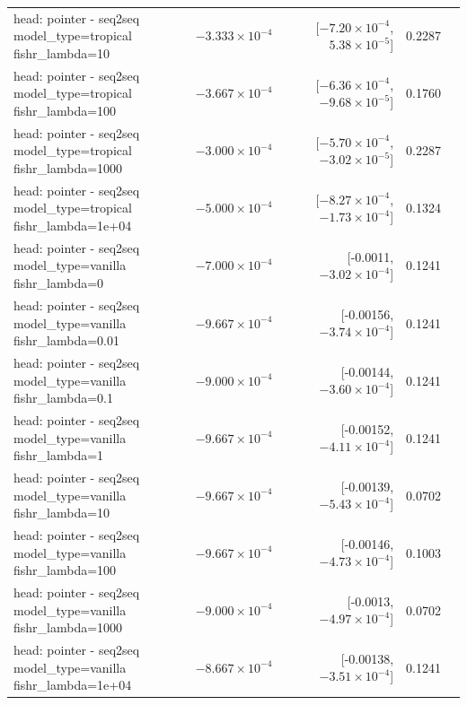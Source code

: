 \documentclass[10pt]{article}
\makeatletter
\newcommand{\stackcell}[1]{\begin{tabular}[t]{@{}l@{}}#1\end{tabular}}
\makeatother
\begin{document}
{\begin{longtable}{lrrrl}
\stackcell{head: pointer - seq2seq\\\footnotesize model\_type=tropical fishr\_lambda=10 } & $-3.333\times10^{-4}$ & [$-7.20\times10^{-4}$, $5.38\times10^{-5}$] & 0.2287 & \\
\stackcell{head: pointer - seq2seq\\\footnotesize model\_type=tropical fishr\_lambda=100 } & $-3.667\times10^{-4}$ & [$-6.36\times10^{-4}$, $-9.68\times10^{-5}$] & 0.1760 & \\
\stackcell{head: pointer - seq2seq\\\footnotesize model\_type=tropical fishr\_lambda=1000 } & $-3.000\times10^{-4}$ & [$-5.70\times10^{-4}$, $-3.02\times10^{-5}$] & 0.2287 & \\
\stackcell{head: pointer - seq2seq\\\footnotesize model\_type=tropical fishr\_lambda=1e+04 } & $-5.000\times10^{-4}$ & [$-8.27\times10^{-4}$, $-1.73\times10^{-4}$] & 0.1324 & \\
\stackcell{head: pointer - seq2seq\\\footnotesize model\_type=vanilla fishr\_lambda=0 } & $-7.000\times10^{-4}$ & [-0.0011, $-3.02\times10^{-4}$] & 0.1241 & \\
\stackcell{head: pointer - seq2seq\\\footnotesize model\_type=vanilla fishr\_lambda=0.01 } & $-9.667\times10^{-4}$ & [-0.00156, $-3.74\times10^{-4}$] & 0.1241 & \\
\stackcell{head: pointer - seq2seq\\\footnotesize model\_type=vanilla fishr\_lambda=0.1 } & $-9.000\times10^{-4}$ & [-0.00144, $-3.60\times10^{-4}$] & 0.1241 & \\
\stackcell{head: pointer - seq2seq\\\footnotesize model\_type=vanilla fishr\_lambda=1 } & $-9.667\times10^{-4}$ & [-0.00152, $-4.11\times10^{-4}$] & 0.1241 & \\
\stackcell{head: pointer - seq2seq\\\footnotesize model\_type=vanilla fishr\_lambda=10 } & $-9.667\times10^{-4}$ & [-0.00139, $-5.43\times10^{-4}$] & 0.0702 & \\
\stackcell{head: pointer - seq2seq\\\footnotesize model\_type=vanilla fishr\_lambda=100 } & $-9.667\times10^{-4}$ & [-0.00146, $-4.73\times10^{-4}$] & 0.1003 & \\
\stackcell{head: pointer - seq2seq\\\footnotesize model\_type=vanilla fishr\_lambda=1000 } & $-9.000\times10^{-4}$ & [-0.0013, $-4.97\times10^{-4}$] & 0.0702 & \\
\stackcell{head: pointer - seq2seq\\\footnotesize model\_type=vanilla fishr\_lambda=1e+04 } & $-8.667\times10^{-4}$ & [-0.00138, $-3.51\times10^{-4}$] & 0.1241 & \\
\bottomrule
\end{longtable}
}
\end{document}
